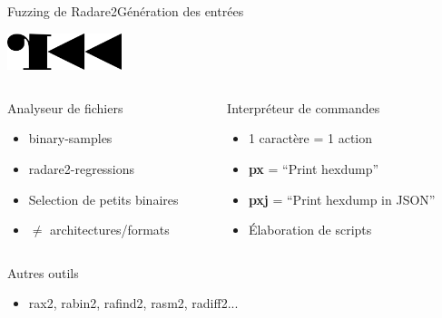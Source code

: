 \begin{frame}[fragile]{Fuzzing de Radare2}{Génération des entrées}
  \begin{center}
    \includegraphics[width=0.25\textwidth, clip=true]{../medias/radare2-logo.png}
    \vspace{-0.2cm}
  \end{center}
  \begin{columns}[T]
    \begin{column}{0.44\linewidth}

      \begin{block}{Analyseur de fichiers}
        \begin{itemize}
        \item{binary-samples}
        \item{radare2-regressions}
        \item{Selection de petits binaires}
        \item{$\ne$ architectures/formats}
        \end{itemize}
      \end{block}
    \end{column}

    \begin{column}{0.44\linewidth}
      \begin{block}{Interpréteur de commandes}
        \begin{itemize}
        \item{1 caractère = 1 action}
        \item{\textbf{px} = ``Print hexdump''}
        \item{\textbf{pxj} = ``Print hexdump in JSON''}
        \item{Élaboration de scripts}
        \end{itemize}
      \end{block}
    \end{column}
  \end{columns}
  \pause
  \vfill
  \begin{exampleblock}{Autres outils}
    \begin{itemize}
    \item{rax2, rabin2, rafind2, rasm2, radiff2...}
    \end{itemize}
  \end{exampleblock}
\end{frame}

